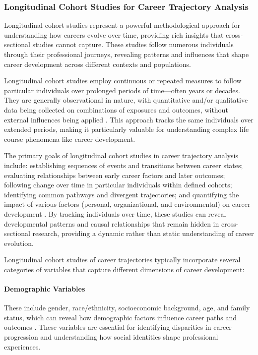 \documentclass[../main.tex]{subfiles}
\begin{document}
\subsubsection{Longitudinal Cohort Studies for Career Trajectory Analysis}

Longitudinal cohort studies represent a powerful methodological approach for understanding how careers evolve over time, providing rich insights that cross-sectional studies cannot capture. These studies follow numerous individuals through their professional journeys, revealing patterns and influences that shape career development across different contexts and populations.


Longitudinal cohort studies employ continuous or repeated measures to follow particular individuals over prolonged periods of time—often years or decades. They are generally observational in nature, with quantitative and/or qualitative data being collected on combinations of exposures and outcomes, without external influences being applied \citep{caruana2015longitudinal}. This approach tracks the same individuals over extended periods, making it particularly valuable for understanding complex life course phenomena like career development.

The primary goals of longitudinal cohort studies in career trajectory analysis include: establishing sequences of events and transitions between career states; evaluating relationships between early career factors and later outcomes; following change over time in particular individuals within defined cohorts; identifying common pathways and divergent trajectories; and quantifying the impact of various factors (personal, organizational, and environmental) on career development \citep{caruana2015longitudinal, porfeli2011career}. By tracking individuals over time, these studies can reveal developmental patterns and causal relationships that remain hidden in cross-sectional research, providing a dynamic rather than static understanding of career evolution.


Longitudinal cohort studies of career trajectories typically incorporate several categories of variables that capture different dimensions of career development:

\paragraph{Demographic Variables}
These include gender, race/ethnicity, socioeconomic background, age, and family status, which can reveal how demographic factors influence career paths and outcomes \citep{dol2021pathways, rios2021career}. These variables are essential for identifying disparities in career progression and understanding how social identities shape professional experiences.
\end{document}
